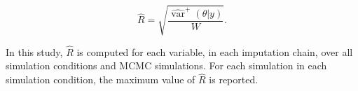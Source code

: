 \documentclass[article]{jss}
\begin{document}
\begin{equation*}
\widehat{R}=\sqrt{\frac{\widehat{\operatorname{var}}^{+}(\theta | y)}{W}}.
\end{equation*}

In this study, $\widehat{R}$ is computed for each variable, in each imputation chain, over all simulation conditions and MCMC simulations. For each simulation in each simulation condition, the maximum value of $\widehat{R}$ is reported.


% 
% 
% 
% 
% 
\end{document}

